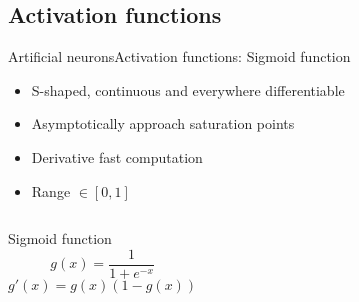\documentclass[10pt,compress]{beamer} %
\begin{document}
\subsection{Activation functions}
\begin{frame}{Artificial neurons}{Activation functions: Sigmoid function}
	\begin{itemize}
		\item S-shaped, continuous and everywhere differentiable
		\item Asymptotically approach saturation points
		\item Derivative fast computation
        \item Range $\in [0, 1]$
	\end{itemize}
    \begin{columns}

                      
                      
	\begin{block}{Sigmoid function}
	\begin{equation*}
	g(x) = \frac{1}{1+e^{-x}}
	\end{equation*}
	\begin{equation*}
	g'(x) = g(x) (1-g(x))
	\end{equation*}
	\end{block}
    \end{columns}
\end{frame}
\end{document}
